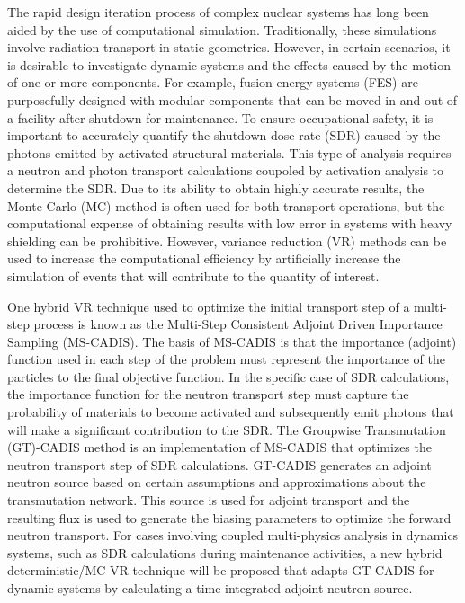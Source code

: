 
\vcinfo{}

The rapid design iteration process of complex nuclear systems has long been
aided by the use of computational simulation.  Traditionally, these simulations
involve radiation transport in static geometries.  However, in certain
scenarios, it is desirable to investigate dynamic systems and the effects caused
by the motion of one or more components.  
For example, fusion energy systems (FES) are purposefully designed with modular components that can be moved in and
out of a facility after shutdown for maintenance. 
To ensure occupational safety, it is important to accurately quantify the
shutdown dose rate (SDR) caused by the photons emitted by activated structural materials.
This type of analysis requires a neutron and photon transport calculations coupoled by activation analysis to determine the SDR.
Due to its ability to obtain highly accurate results, the Monte Carlo (MC) method is often used for both transport operations, but the computational expense of obtaining results with low
error 
in systems with heavy shielding can be prohibitive.  
However, variance reduction (VR)
methods can be used to increase the computational efficiency by artificially increase the simulation of
events that will contribute to the quantity of interest.

One hybrid VR technique used to optimize the initial transport step of a
multi-step process is known as 
the Multi-Step Consistent Adjoint Driven Importance Sampling
(MS-CADIS). 
 The basis of MS-CADIS is that the importance (adjoint) function used
in each step of the problem must represent the importance of the particles to
the final objective function.  
In the specific case of SDR calculations, the importance function for the neutron transport step
must capture the probability of materials to become activated and subsequently emit photons that
will make a significant contribution to the SDR.
The Groupwise Transmutation (GT)-CADIS method 
is an implementation of MS-CADIS
that optimizes the neutron transport step of SDR calculations.
GT-CADIS generates an adjoint
neutron source based on certain assumptions and approximations about the
transmutation network.  
This source is used for adjoint transport and the resulting flux is used to
generate the biasing parameters to optimize the forward neutron transport.
For cases involving coupled multi-physics analysis in dynamics systems, such as SDR calculations
during maintenance activities,
a new hybrid deterministic/MC VR technique will be proposed that adapts 
GT-CADIS for dynamic systems by calculating a time-integrated adjoint
neutron source.


